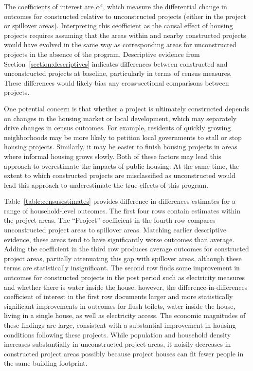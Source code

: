 \documentclass[12pt]{article}
\begin{document}
The coefficients of interest are $\alpha^e$, which measure the differential change in outcomes for constructed relative to unconstructed projects (either in the project or spillover areas).  Interpreting this ceofficient as the causal effect of housing projects requires assuming that the areas within and nearby constructed projects would have evolved in the same way as corresponding areas for unconstructed projects in the absence of the program.  Descriptive evidence from Section~\ref{section:descriptives} indicates differences between constructed and unconstructed projects at baseline, particularly in terms of census measures.  These differences would likely bias any cross-sectional comparisons between projects. 

One potential concern is that whether a project is ultimately constructed depends on changes in the housing market or local development, which may separately drive changes in census outcomes.  For example, residents of quickly growing neighborhoods may be more likely to petition local governments to stall or stop housing projects.  Similarly, it may be easier to finish housing projects in areas where informal housing grows slowly.  Both of these factors may lead this approach to overestimate the impacts of public housing.  At the same time, the extent to which constructed projects are misclassified as unconstructed would lead this approach to underestimate the true effects of this program.

Table~\ref{table:censusestimates} provides difference-in-differences estimates for a range of household-level outcomes.  The first four rows contain estimates within the project areas.  The ``Project'' coefficient in the fourth row compares unconstructed project areas to spillover areas.  Matching earlier descriptive evidence, these areas tend to have significantly worse outcomes than average.  Adding the coefficient in the third row produces average outcomes for constructed project areas, partially attenuating this gap with spillover areas, although these terms are statistically insignificant.  The second row finds some improvement in outcomes for constructed projects in the post period such as electricity measures and whether there is water inside the house; however, the difference-in-differences coefficient of interest in the first row documents larger and more statistically significant improvements in outcomes for flush toilets, water inside the house, living in a single house, as well as electricity access.  The economic magnitudes of these findings are large, consistent with a substantial improvement in housing conditions following these projects.  While population and household density increases substantially in unconstructed project areas, it noisily decreases in constructed project areas possibly because project houses can fit fewer people in the same building footprint.
\end{document}
